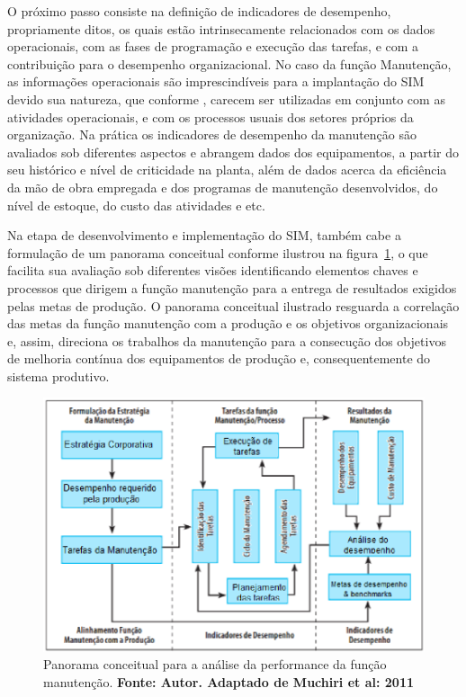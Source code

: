 O próximo passo consiste na definição de indicadores de desempenho, propriamente ditos, os quais estão intrinsecamente relacionados com os dados operacionais, com as fases de programação e execução das tarefas, e com a contribuição para o desempenho organizacional. No caso da função Manutenção, as informações operacionais são imprescindíveis para a implantação do SIM devido sua natureza, que conforme \cite{martorell1999}, carecem ser utilizadas em conjunto com as atividades operacionais, e com os processos usuais dos setores próprios da organização. Na prática os indicadores de desempenho da manutenção são avaliados sob diferentes aspectos e abrangem dados dos equipamentos, a partir do seu histórico e nível de criticidade na planta, além de dados acerca da eficiência da mão de obra empregada e dos programas de manutenção desenvolvidos, do nível de estoque, do custo das atividades e etc.

Na etapa de desenvolvimento e implementação do SIM, também cabe a formulação de um panorama conceitual conforme ilustrou \cite{muchiri2011development} na figura~\ref{Desempenho da funcao manutencao}, o que facilita sua avaliação sob diferentes visões identificando elementos chaves e processos que dirigem a função manutenção para a entrega de resultados exigidos pelas metas de produção. O panorama conceitual ilustrado resguarda a correlação das metas da função manutenção com a produção e os objetivos organizacionais e, assim, direciona os trabalhos da manutenção para a consecução dos objetivos de melhoria contínua dos equipamentos de produção e, consequentemente do sistema produtivo.

\graphicspath{{figuras/}}
\begin{figure}[H]
\centering
\includegraphics[width=1\textwidth]{desempenho_da_funcao_manutencao.eps}
\caption{Panorama conceitual para a análise da performance da função manutenção. \textbf{Fonte: Autor. Adaptado de Muchiri et al: 2011}}
\label{Desempenho da funcao manutencao}
\end{figure}

